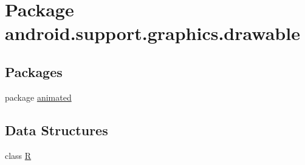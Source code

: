 \hypertarget{namespaceandroid_1_1support_1_1graphics_1_1drawable}{}\section{Package android.\+support.\+graphics.\+drawable}
\label{namespaceandroid_1_1support_1_1graphics_1_1drawable}
\subsection*{Packages}
\begin{DoxyCompactItemize}
\item 
package \mbox{\hyperlink{namespaceandroid_1_1support_1_1graphics_1_1drawable_1_1animated}{animated}}
\end{DoxyCompactItemize}
\subsection*{Data Structures}
\begin{DoxyCompactItemize}
\item 
class \mbox{\hyperlink{classandroid_1_1support_1_1graphics_1_1drawable_1_1_r}{R}}
\end{DoxyCompactItemize}
